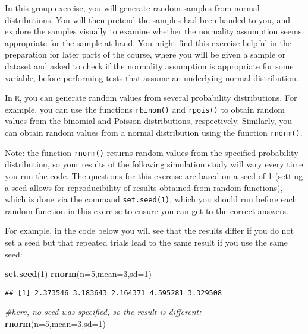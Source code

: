 \documentclass[
]{book}
\newenvironment{Shaded}{\begin{snugshade}}{\end{snugshade}}
\newcommand{\AttributeTok}[1]{\textcolor[rgb]{0.13,0.29,0.53}{#1}}
\newcommand{\CommentTok}[1]{\textcolor[rgb]{0.56,0.35,0.01}{\textit{#1}}}
\newcommand{\DecValTok}[1]{\textcolor[rgb]{0.00,0.00,0.81}{#1}}
\newcommand{\FunctionTok}[1]{\textcolor[rgb]{0.13,0.29,0.53}{\textbf{#1}}}
\newcommand{\NormalTok}[1]{#1}
\begin{document}
In this group exercise, you will generate random samples from normal distributions. You will then pretend the samples had been handed to you, and explore the samples visually to examine whether the normality assumption seems appropriate for the sample at hand. You might find this exercise helpful in the preparation for later parts of the course, where you will be given a sample or dataset and asked to check if the normality assumption is appropriate for some variable, before performing tests that assume an underlying normal distribution.

In \texttt{R}, you can generate random values from several probability distributions. For example, you can use the functions \texttt{rbinom()} and \texttt{rpois()} to obtain random values from the binomial and Poisson distributions, respectively. Similarly, you can obtain random values from a normal distribution using the function \texttt{rnorm()}.

Note: the function \texttt{rnorm()} returns random values from the specified probability distribution, so your results of the following simulation study will vary every time you run the code. The questions for this exercise are based on a seed of 1 (setting a seed allows for reproducibility of results obtained from random functions), which is done via the command \texttt{set.seed(1)}, which you should run before each random function in this exercise to ensure you can get to the correct answers.

For example, in the code below you will see that the results differ if you do not set a seed but that repeated trials lead to the same result if you use the same seed:

\begin{Shaded}
\begin{Highlighting}[]
\FunctionTok{set.seed}\NormalTok{(}\DecValTok{1}\NormalTok{)}
\FunctionTok{rnorm}\NormalTok{(}\AttributeTok{n=}\DecValTok{5}\NormalTok{,}\AttributeTok{mean=}\DecValTok{3}\NormalTok{,}\AttributeTok{sd=}\DecValTok{1}\NormalTok{)}
\end{Highlighting}
\end{Shaded}

\begin{verbatim}
## [1] 2.373546 3.183643 2.164371 4.595281 3.329508
\end{verbatim}

\begin{Shaded}
\begin{Highlighting}[]
\CommentTok{\#here, no seed was specified, so the result is different:}
\FunctionTok{rnorm}\NormalTok{(}\AttributeTok{n=}\DecValTok{5}\NormalTok{,}\AttributeTok{mean=}\DecValTok{3}\NormalTok{,}\AttributeTok{sd=}\DecValTok{1}\NormalTok{)}
\end{Highlighting}
\end{Shaded}
\end{document}
